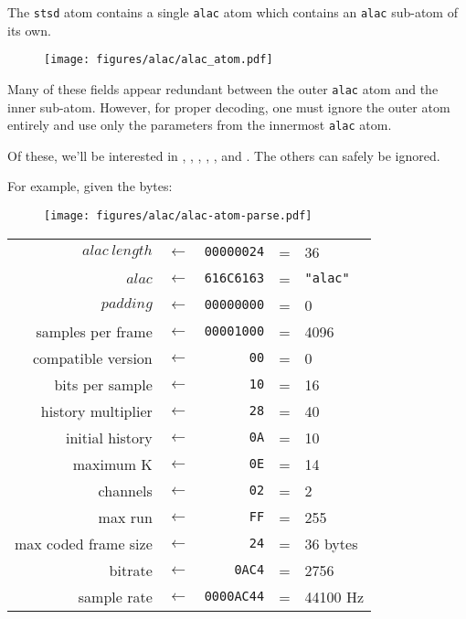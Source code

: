 The \texttt{stsd} atom contains a single \texttt{alac} atom
which contains an \texttt{alac} sub-atom of its own.
\begin{figure}[h]
\texttt{[image: figures/alac/alac\_atom.pdf]}
\end{figure}
\par
\noindent
Many of these fields appear redundant between the outer \texttt{alac} atom
and the inner sub-atom.
However, for proper decoding, one must ignore the outer atom entirely
and use only the parameters from the innermost \texttt{alac} atom.

Of these, we'll be interested in ,
, , ,
,  and .
The others can safely be ignored.

\clearpage

For example, given the bytes:
\par
\begin{figure}[h]
\texttt{[image: figures/alac/alac-atom-parse.pdf]}
\end{figure}
\begin{tabular}{rcrcl}
$alac~length$ & $\leftarrow$ & \texttt{00000024} & = & 36 \\
$alac$ & $\leftarrow$ & \texttt{616C6163} & = & \texttt{"alac"} \\
$padding$ & $\leftarrow$ & \texttt{00000000} & = & 0 \\
samples per frame & $\leftarrow$ & \texttt{00001000} & = & 4096 \\
compatible version & $\leftarrow$ & \texttt{00} & = & 0 \\
bits per sample & $\leftarrow$ & \texttt{10} & = & 16 \\
history multiplier & $\leftarrow$ & \texttt{28} & = & 40 \\
initial history & $\leftarrow$ & \texttt{0A} & = & 10 \\
maximum K & $\leftarrow$ & \texttt{0E} & = & 14 \\
channels & $\leftarrow$ & \texttt{02} & = & 2 \\
max run & $\leftarrow$ & \texttt{FF} & = & 255 \\
max coded frame size & $\leftarrow$ & \texttt{24} & = & 36 bytes \\
bitrate & $\leftarrow$ & \texttt{0AC4} & = & 2756 \\
sample rate & $\leftarrow$ & \texttt{0000AC44} & = & 44100 Hz\\
\end{tabular}

